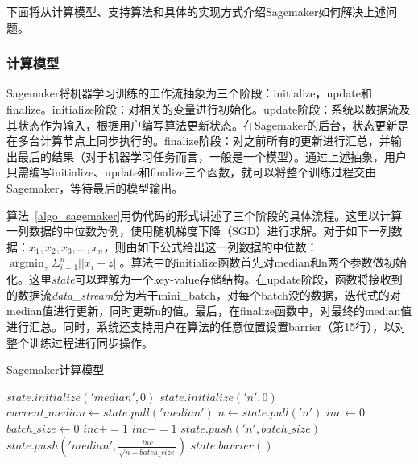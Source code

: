 下面将从计算模型、支持算法和具体的实现方式介绍Sagemaker如何解决上述问题。

\subsubsection{计算模型}
Sagemaker将机器学习训练的工作流抽象为三个阶段：initialize，update和finalize。initialize阶段：对相关的变量进行初始化。update阶段：系统以数据流及其状态作为输入，根据用户编写算法更新状态。在Sagemaker的后台，状态更新是在多台计算节点上同步执行的。finalize阶段：对之前所有的更新进行汇总，并输出最后的结果（对于机器学习任务而言，一般是一个模型）。通过上述抽象，用户只需编写initialize、update和finalize三个函数，就可以将整个训练过程交由Sagemaker，等待最后的模型输出。

算法~\ref{algo_sagemaker}用伪代码的形式讲述了三个阶段的具体流程。这里以计算一列数据的中位数为例，使用随机梯度下降（SGD）进行求解。对于如下一列数据：$x_1, x_2, x_3, ..., x_n$，则由如下公式给出这一列数据的中位数：$\operatorname{argmin}_z\Sigma_{i=1}^n||x_i-z||$。算法中的initialize函数首先对median和n两个参数做初始化。这里\textit{state}可以理解为一个key-value存储结构。在update阶段，函数将接收到的数据流\textit{data\_stream}分为若干mini\_batch，对每个batch没的数据，迭代式的对median值进行更新，同时更新n的值。最后，在finalize函数中，对最终的median值进行汇总。同时，系统还支持用户在算法的任意位置设置barrier（第15行），以对整个训练过程进行同步操作。

\begin{algorithm}
    \caption{Sagemaker计算模型}
    \label{algo_sagemaker}
    \begin{algorithmic}[1] 
        \State $state.initialize('median', 0)$
        \State $state.initialize('n', 0)$
        \EndFunction
        \State
        \State $current\_median \gets state.pull('median')$
        \State $n \gets state.pull('n')$
        \State $inc \gets 0$
        \State $batch\_size \gets 0$
        \State $inc += 1$
        \Else
        \State $inc -= 1$
        \EndIf
        \EndFor
        \State $state.push('n', batch\_size)$
        \State $state.push('median',\frac{inc}{\sqrt{n + batch\_size}})$
        \State $state.barrier()$
        \EndIf
        \EndFor
        \EndFunction
        \State
        \State {}
        \EndFunction
    \end{algorithmic}
\end{algorithm}

